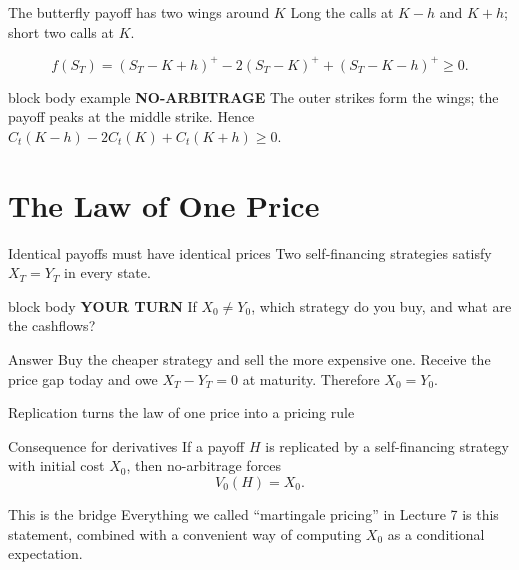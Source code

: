 \documentclass[handout,10pt,aspectratio=169]{beamer}
\newenvironment{marketbox}{\begin{beamercolorbox}[rounded=true,sep=0.7em,wd=\textwidth]{block body example}
  \textbf{\color{CourseGreen}NO-ARBITRAGE}\quad}{\end{beamercolorbox}}
\newenvironment{pausebox}{\begin{beamercolorbox}[rounded=true,sep=0.8em,wd=\textwidth]{block body}
  \textbf{\color{CourseGold}YOUR TURN}\quad}{\end{beamercolorbox}}
\newcommand{\1}{\mathbf 1}
\begin{document}
\begin{frame}{The butterfly payoff has two wings around \(K\)}
Long the calls at \(K-h\) and \(K+h\); short two calls at \(K\).
\begin{center}
\end{center}
\vspace{-0.4em}
\[
f(S_T)=(S_T-K+h)^+-2(S_T-K)^++(S_T-K-h)^+\geq0.
\]
\begin{marketbox}
The outer strikes form the wings; the payoff peaks at the middle strike.
Hence \(C_t(K-h)-2C_t(K)+C_t(K+h)\geq0\).
\end{marketbox}
\end{frame}

\section{The Law of One Price}

\begin{frame}{Identical payoffs must have identical prices}
Two self-financing strategies satisfy \(X_T=Y_T\) in every state.
\begin{pausebox}
If \(X_0\ne Y_0\), which strategy do you buy, and what are the cashflows?
\end{pausebox}

\begin{exampleblock}{Answer}
Buy the cheaper strategy and sell the more expensive one. Receive the price
gap today and owe \(X_T-Y_T=0\) at maturity. Therefore
\(\boxed{X_0=Y_0}\).
\end{exampleblock}
\end{frame}



\begin{frame}{Replication turns the law of one price into a pricing rule}
\begin{block}{Consequence for derivatives}
If a payoff \(H\) is replicated by a self-financing strategy with initial
cost \(X_0\), then no-arbitrage forces
\[
\boxed{V_0(H)=X_0.}
\]
\end{block}
\begin{exampleblock}{This is the bridge}
Everything we called ``martingale pricing'' in Lecture 7 is this statement,
combined with a convenient way of computing \(X_0\) as a conditional
expectation.
\end{exampleblock}
\end{frame}
\end{document}

